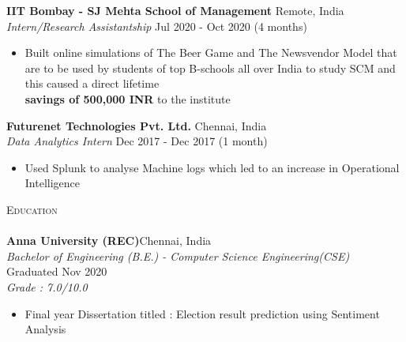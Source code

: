 \documentclass[a4paper]{article}
\newcommand{\lineunder} {
    \vspace*{-8pt} \\
    \hspace*{-18pt} \hrulefill \\
}
\newcommand{\header} [1] {
    {\hspace*{-18pt}\vspace*{6pt} \textsc{#1}}
    \vspace*{-6pt} \lineunder
}
\begin{document}
\textbf{IIT Bombay - SJ Mehta School of Management} \hfill Remote, India\\
\textit{Intern/Research Assistantship} \hfill Jul 2020 - Oct 2020 (4 months)\\
\vspace{-1mm}
\begin{itemize} \itemsep 1pt
    \item Built online simulations of The Beer Game and The Newsvendor Model that are to be used by students of top B-schools all over India to study SCM and this caused a direct lifetime \\\textbf{savings of 500,000 INR} to the institute
\end{itemize}
\textbf{Futurenet Technologies Pvt. Ltd.} \hfill Chennai, India\\
\textit{Data Analytics Intern} \hfill Dec 2017 - Dec 2017 (1 month)\\ 
\vspace{-1mm}
\begin{itemize} \itemsep 1pt
    \item Used Splunk to analyse Machine logs which led to an increase in Operational Intelligence
\end{itemize}


\header{Education}
\textbf{Anna University (REC)}\hfill Chennai, India\\
\textit{Bachelor of Engineering (B.E.) - Computer Science Engineering(CSE)} \hfill Graduated Nov 2020 \\
\textit{Grade : 7.0/10.0}
\begin{itemize} \itemsep 0.5pt
\item Final year Dissertation titled : Election result prediction using Sentiment Analysis\\
\end{itemize}
\vspace{1mm}


\end{document}
